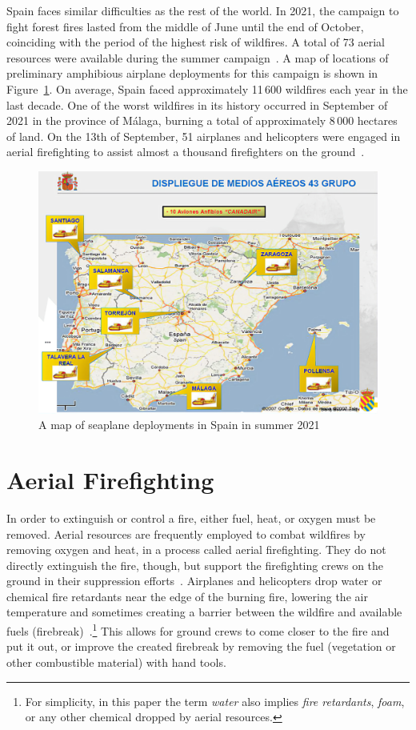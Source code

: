Spain faces similar difficulties as the rest of the world.
In 2021, the campaign to fight forest fires lasted from the middle of June until the end of October, coinciding with the period of the highest risk of wildfires.
A total of 73 aerial resources were available during the summer campaign~\cite{Spain/Campaign}.
A map of locations of preliminary amphibious airplane deployments for this campaign is shown in Figure~\ref{fig:spain-airplanes-deployment}.
On average, Spain faced approximately 11\,600 wildfires each year in the last decade.
One of the worst wildfires in its history occurred in September of 2021 in the province of Málaga, burning a total of approximately 8\,000 hectares of land.
On the 13th of September, 51 airplanes and helicopters were engaged in aerial firefighting to assist almost a thousand firefighters on the ground~\cite{ElMundo/Malaga}.

\begin{figure}[tb]
    \centering
    \includegraphics[width=0.9\linewidth]{img/spain-airplanes-deployment.jpg}
    \caption{A map of seaplane deployments in Spain in summer 2021~\cite{Spain/Campaign}}
    \label{fig:spain-airplanes-deployment}
\end{figure}


\section{Aerial Firefighting}

In order to extinguish or control a fire, either fuel, heat, or oxygen must be removed.
Aerial resources are frequently employed to combat wildfires by removing oxygen and heat, in a process called aerial firefighting.
They do not directly extinguish the fire, though, but support the firefighting crews on the ground in their suppression efforts~\cite{Canada/Suppression}.
Airplanes and helicopters drop water or chemical fire retardants near the edge of the burning fire, lowering the air temperature and sometimes creating a barrier between the wildfire and available fuels (firebreak)~\cite{Canada/Retardants}.\footnote{For simplicity, in this paper the term \textit{water} also implies \textit{fire retardants}, \textit{foam}, or any other chemical dropped by aerial resources.}
This allows for ground crews to come closer to the fire and put it out, or improve the created firebreak by removing the fuel (vegetation or other combustible material) with hand tools.

